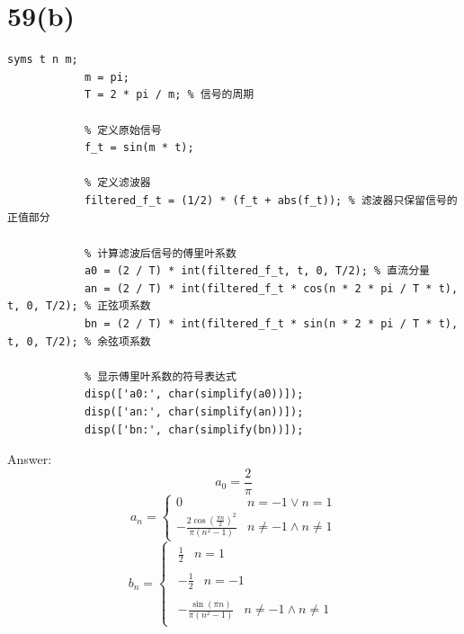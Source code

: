 \documentclass{article}
\begin{document}
    \section*{59(b)}
        \begin{lstlisting}[caption={题59(b)MATLAB代码}, label={lst:matlab}]
            syms t n m;
            m = pi;
            T = 2 * pi / m; % 信号的周期

            % 定义原始信号
            f_t = sin(m * t);

            % 定义滤波器
            filtered_f_t = (1/2) * (f_t + abs(f_t)); % 滤波器只保留信号的正值部分

            % 计算滤波后信号的傅里叶系数
            a0 = (2 / T) * int(filtered_f_t, t, 0, T/2); % 直流分量
            an = (2 / T) * int(filtered_f_t * cos(n * 2 * pi / T * t), t, 0, T/2); % 正弦项系数
            bn = (2 / T) * int(filtered_f_t * sin(n * 2 * pi / T * t), t, 0, T/2); % 余弦项系数

            % 显示傅里叶系数的符号表达式
            disp(['a0:', char(simplify(a0))]);
            disp(['an:', char(simplify(an))]);
            disp(['bn:', char(simplify(bn))]);
        \end{lstlisting}
        Answer: \[{a_0} = \frac{2}{\pi }\]
                \[{a_n} = \left\{ {\begin{array}{*{20}{c}}
                0&{n =  - 1 \vee n = 1} \\ 
                { - \frac{{2\cos {{\left( {\frac{{\pi n}}{2}} \right)}^2}}}{{\pi \left( {{n^2} - 1} \right)}}}&{n \ne  - 1 \wedge n \ne 1} 
                \end{array}} \right.\]
                \[{b_n} = \left\{ {\begin{array}{*{20}{c}}
                    {\begin{array}{*{20}{c}}
                    {\frac{1}{2}}&{n = 1} 
                  \end{array}} \\ 
                    {\begin{array}{*{20}{c}}
                    { - \frac{1}{2}}&{n =  - 1} 
                  \end{array}} \\ 
                    {\begin{array}{*{20}{c}}
                    { - \frac{{\sin (\pi n)}}{{\pi ({n^2} - 1)}}}&{n \ne  - 1 \wedge n \ne 1} 
                  \end{array}} 
                  \end{array}} \right.\]
\end{document}
